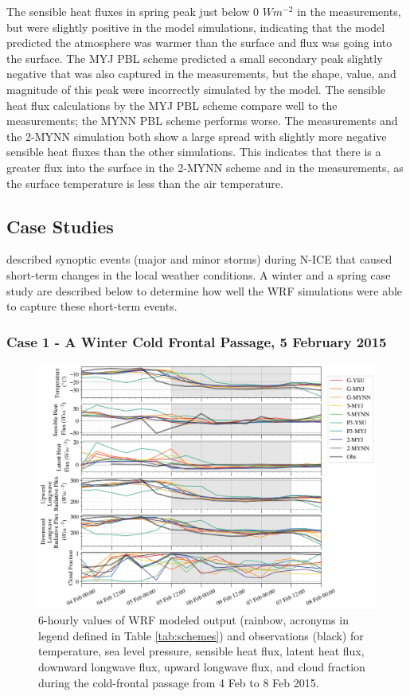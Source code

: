 The sensible heat fluxes in spring peak just below 0 $Wm^{-2}$ in the measurements, but were slightly positive in the model simulations, indicating that the model predicted the atmosphere was warmer than the surface and flux was going into the surface. The MYJ PBL scheme predicted a small secondary peak slightly negative that was also captured in the measurements, but the shape, value, and magnitude of this peak were incorrectly simulated by the model. The sensible heat flux calculations by the MYJ PBL scheme compare well to the measurements; the MYNN PBL scheme performs worse. The measurements and the 2-MYNN simulation both show a large spread with slightly more negative sensible heat fluxes than the other simulations. This indicates that there is a greater flux into the surface in the 2-MYNN scheme and in the measurements, as the surface temperature is less than the air temperature.

\subsection{Case Studies}
\citet{cohen:2015} described synoptic events (major and minor storms) during N-ICE that caused short-term changes in the local weather conditions. A winter and a spring case study are described below to determine how well the WRF simulations were able to capture these short-term events.

\subsubsection{Case 1 - A Winter Cold Frontal Passage, 5 February 2015}
\begin{figure}[p]
    \centering \hspace*{-0.75cm}
    \includegraphics[width=1.1\linewidth]{figures/chapter3/wrf_case1.png}
    \caption[Polar WRF Case 1 - Winter cold front (5 Feb 2015) time series]{6-hourly values of WRF modeled output (rainbow, acronyms in legend defined in Table \ref{tab:schemes}) and observations (black) for temperature, sea level pressure, sensible heat flux, latent heat flux, downward longwave flux, upward longwave flux, and cloud fraction during the cold-frontal passage from 4 Feb to 8 Feb 2015.}
    \label{fig:wrf_case1}
\end{figure}

